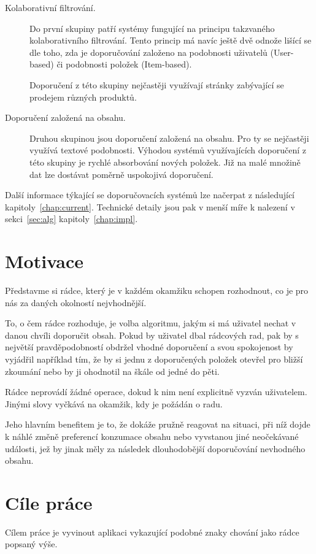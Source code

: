\documentclass[thesis=M,czech]{FITthesis}[2014/05/07]
\begin{document}
\begin{introduction}
\begin{description}
	\item[Kolaborativní filtrování.] Do první skupiny patří systémy fungující na principu takzvaného kolaborativního filtrování. Tento princip má navíc ještě dvě odnože lišící se dle toho, zda je doporučování založeno na podobnosti uživatelů (User-based) či podobnosti položek (Item-based). 
	
	Doporučení z této skupiny nejčastěji využívají stránky zabývající se prodejem různých produktů.
	
	\item[Doporučení založená na obsahu.] Druhou skupinou jsou doporučení založená na obsahu. Pro ty se nejčastěji využívá textové podobnosti. Výhodou systémů využívajících doporučení z této skupiny je rychlé absorbování nových položek. Již na malé množině dat lze dostávat poměrně uspokojivá doporučení.
\end{description}
 
Další informace týkající se doporučovacích systémů lze načerpat z následující kapitoly~\ref{chap:current}. Technické detaily jsou pak v menší míře k nalezení v sekci~\ref{sec:alg} kapitoly~\ref{chap:impl}.

\section{Motivace} 	
\label{sec:motivation}
	Představme si rádce, který je v každém okamžiku schopen rozhodnout, co je pro nás za daných okolností nejvhodnější.
	
	To, o čem rádce rozhoduje, je volba algoritmu, jakým si má uživatel nechat v danou chvíli doporučit obsah. Pokud by uživatel dbal rádcových rad, pak by s největší pravděpodobností obdržel vhodné doporučení a svou spokojenost by vyjádřil například tím, že by si jednu z doporučených položek otevřel pro bližší zkoumání nebo by ji ohodnotil na škále od jedné do pěti.
	
	Rádce neprovádí žádné operace, dokud k nim není explicitně vyzván uživatelem. Jinými slovy vyčkává na okamžik, kdy je požádán o radu.
	
	Jeho hlavním benefitem je to, že dokáže pružně reagovat na situaci, při níž dojde k náhlé změně preferencí konzumace obsahu nebo vyvstanou jiné neočekávané události, jež by jinak měly za následek dlouhodobější doporučování nevhodného obsahu.
	
\section{Cíle práce}
\label{sec:objectives}
	Cílem práce je vyvinout aplikaci vykazující podobné znaky chování jako rádce popsaný výše.


\end{introduction}
\end{document}
